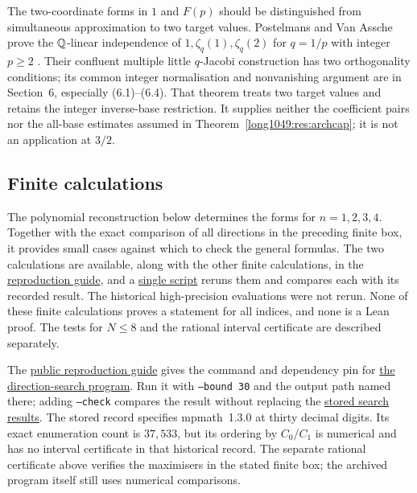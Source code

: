 \documentclass[11pt]{article}
\begin{document}
The two-coordinate forms in $1$ and $F(p)$ should be distinguished
from simultaneous approximation to two target values. Postelmans and Van Assche prove the $\mathbb{Q}$-linear independence
of $1,\zeta_q(1),\zeta_q(2)$ for $q=1/p$ with integer $p\ge2$
\cite[Thm.~1.3, p.~3]{postelmansvanassche2007}.
Their confluent multiple little $q$-Jacobi construction has two
orthogonality conditions; its common integer normalisation and
nonvanishing argument are in Section~6, especially (6.1)--(6.4).
That theorem treats two target values and retains the integer
inverse-base restriction. It supplies neither the coefficient pairs
nor the all-base estimates assumed in Theorem~\ref{long1049:res:archcap};
it is not an application at $3/2$.

\subsection{Finite calculations}\label{long1049:sec:receipts}

The polynomial reconstruction below determines the forms for
$n=1,2,3,4$. Together with the exact comparison of all directions in
the preceding finite box, it provides small cases against which to
check the general formulas. The two calculations are available,
along with the other finite calculations, in the
\href{https://github.com/wcook04/plectis-erdos/blob/f5c9e560df38cd32e9b49473a409384aab00d9ae/research/experiments/erdos1049/README.md}{reproduction guide}, and a
\href{https://github.com/wcook04/plectis-erdos/blob/f5c9e560df38cd32e9b49473a409384aab00d9ae/research/experiments/erdos1049/replay.py}{single script}
reruns them and compares each with its recorded result. The historical
high-precision evaluations were not rerun. None of these finite
calculations proves a statement for all indices, and none is a Lean proof. The
tests for $N\le8$ and the rational interval certificate are described
separately.

The \href{https://github.com/wcook04/plectis-erdos/blob/f5c9e560df38cd32e9b49473a409384aab00d9ae/research/experiments/erdos1049/README.md}{public reproduction guide} gives the command and dependency pin for
\href{https://github.com/wcook04/plectis-erdos/blob/39a0a2078c8f9fbe7fc24f912654815cc24685df/research/experiments/erdos1049/direction_search.py}{the direction-search program}.
Run it with \texttt{--bound 30} and the output path named there; adding
\texttt{--check} compares the result without replacing the
\href{https://github.com/wcook04/plectis-erdos/blob/39a0a2078c8f9fbe7fc24f912654815cc24685df/research/experiments/erdos1049/receipts/direction-search-bound30.json}{stored search results}.
The stored record specifies mpmath~1.3.0 at thirty decimal digits.  Its exact enumeration
count is $37{,}533$, but its ordering by $C_0/C_1$ is numerical and has no
interval certificate in that historical record. The separate rational
certificate above verifies the maximisers in the stated finite box;
the archived program itself still uses numerical comparisons.
\end{document}
